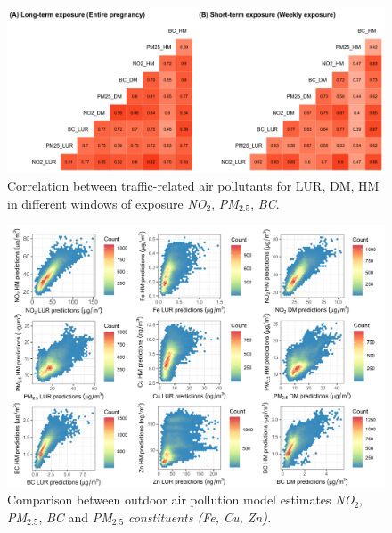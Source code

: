\documentclass{article}
\begin{document}
\captionsetup[figure]{skip=6pt}
\begin{figure}[!htb]
\includegraphics[width=1.0\textwidth]{figures/correlation_fig.png}
\caption{Correlation between traffic-related air pollutants for LUR, DM, HM in different windows of exposure \textit{NO$_2$}, \textit{PM$_{2.5}$}, \textit{BC}.}
\end{figure}



\newpage


\captionsetup[figure]{skip=6pt}
\begin{figure}[!htb]
\includegraphics[width=1.0\textwidth]{figures/final_HEXBIN.png}
\caption{Comparison between outdoor air pollution model estimates \textit{NO$_2$}, \textit{PM$_{2.5}$}, \textit{BC} and \textit{PM$_{2.5}$ constituents (Fe, Cu, Zn).}}
\end{figure}
\end{document}
